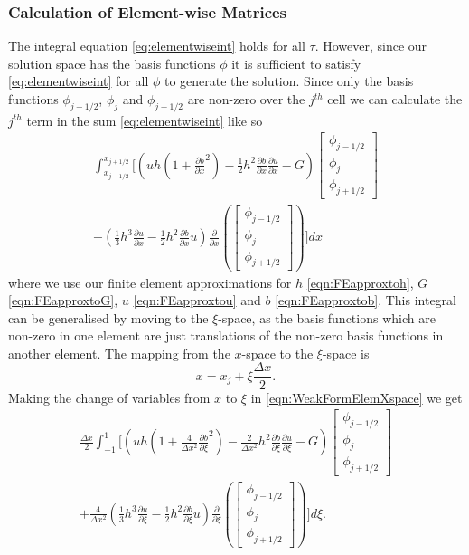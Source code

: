 \subsubsection{Calculation of Element-wise Matrices}
The integral equation \eqref{eq:elementwiseint} holds for all $\tau$. However, since our solution space has the basis functions $\phi$ it is sufficient to satisfy \eqref{eq:elementwiseint} for all $\phi$ to generate the solution. Since only the basis functions $\phi_{j-1/2}$, $\phi_{j}$ and $\phi_{j+1/2}$ are non-zero over the $j^{th}$ cell we can calculate the $j^{th}$ term in the sum \eqref{eq:elementwiseint} like so
\begin{multline}
\int_{x_{j-1/2} }^{{x_{j+1/2}}} \Bigg[  \left( uh \left(1 + \frac{\partial b}{\partial x}^2 \right)  - \frac{1}{2}h^2\frac{\partial b}{\partial x}  \frac{\partial u }{\partial x}  -  G \right) \begin{bmatrix}
\phi_{j-1/2}\\\phi_j \\\phi_{j+1/2}
\end{bmatrix}   \\ +  \left( \frac{1}{3}h^3  \frac{\partial {u}}{\partial x}    -     \frac{1}{2}h^2\frac{\partial b}{\partial x} u    \right) \frac{\partial}{\partial x}\left(\begin{bmatrix}
\phi_{j-1/2}\\\phi_j \\\phi_{j+1/2}
\end{bmatrix} \right) \Bigg]dx
\label{eqn:WeakFormElemXspace}
\end{multline}
where we use our finite element approximations for $h$ \eqref{eqn:FEapproxtoh}, $G$ \eqref{eqn:FEapproxtoG}, $u$ \eqref{eqn:FEapproxtou} and $b$ \eqref{eqn:FEapproxtob}. This integral can be generalised by moving to the $\xi$-space, as the basis functions which are non-zero in one element are just translations of the non-zero basis functions in another element. The mapping from the $x$-space to the $\xi$-space is
\begin{equation*}
x = x_j + \xi \frac{\Delta x}{2}.
\end{equation*}
Making the change of variables from $x$ to $\xi$ in \eqref{eqn:WeakFormElemXspace} we get
\begin{multline*}
\frac{\Delta x}{2}\int_{-1 }^{1} \Bigg[  \left( uh \left(1 + \frac{4}{\Delta x^2}\frac{\partial b}{\partial \xi}^2 \right)  - \frac{2}{\Delta x^2} h^2 \frac{\partial b}{\partial \xi}  \frac{\partial u }{\partial \xi}  -  G \right) \begin{bmatrix}
\phi_{j-1/2}\\\phi_j \\\phi_{j+1/2}
\end{bmatrix}   \\ + \frac{4}{\Delta x^2} \left( \frac{1}{3}h^3 \frac{\partial {u}}{\partial \xi}    -     \frac{1}{2}h^2 \frac{\partial b}{\partial \xi} u    \right) \frac{\partial}{\partial \xi}\left(\begin{bmatrix}
\phi_{j-1/2}\\\phi_j \\\phi_{j+1/2}
\end{bmatrix} \right) \Bigg]d\xi.
\end{multline*}

